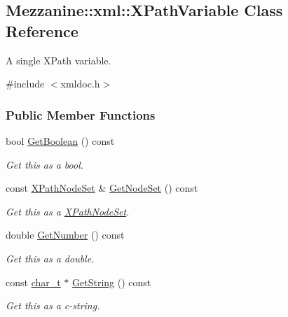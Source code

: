 \hypertarget{classMezzanine_1_1xml_1_1XPathVariable}{
\subsection{Mezzanine::xml::XPathVariable Class Reference}
\label{classMezzanine_1_1xml_1_1XPathVariable}
}


A single XPath variable.  




{\ttfamily \#include $<$xmldoc.h$>$}

\subsubsection*{Public Member Functions}
\begin{DoxyCompactItemize}
\item 
bool \hyperlink{classMezzanine_1_1xml_1_1XPathVariable_aa69dac9e5ac215b867d45abb90941aca}{GetBoolean} () const 
\begin{DoxyCompactList}\small\item\em Get this as a bool. \item\end{DoxyCompactList}\item 
const \hyperlink{classMezzanine_1_1xml_1_1XPathNodeSet}{XPathNodeSet} \& \hyperlink{classMezzanine_1_1xml_1_1XPathVariable_abf5b6cf5c0ccd6936750e68b46c045be}{GetNodeSet} () const 
\begin{DoxyCompactList}\small\item\em Get this as a \hyperlink{classMezzanine_1_1xml_1_1XPathNodeSet}{XPathNodeSet}. \item\end{DoxyCompactList}\item 
double \hyperlink{classMezzanine_1_1xml_1_1XPathVariable_a7278b0cd33a6f45f0d6486a9e0bfd900}{GetNumber} () const 
\begin{DoxyCompactList}\small\item\em Get this as a double. \item\end{DoxyCompactList}\item 
const \hyperlink{namespaceMezzanine_1_1xml_a29b8a47c179e9895c4e9e66c45d1dbbc}{char\_\-t} $\ast$ \hyperlink{classMezzanine_1_1xml_1_1XPathVariable_a6543060043d1775043ec62dea424281d}{GetString} () const 
\begin{DoxyCompactList}\small\item\em Get this as a c-\/string. \item\end{DoxyCompactList}\item 

\end{DoxyCompactItemize}
